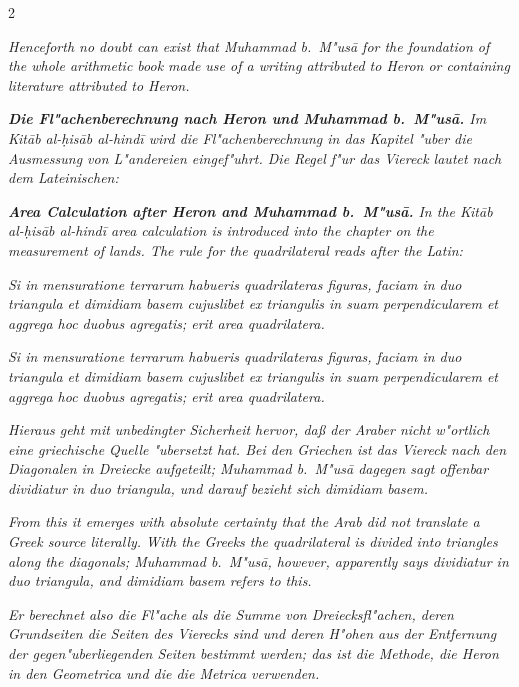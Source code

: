 \documentclass[10pt,a4paper]{article}
\begin{document}
\begin{paracol}{2}
\switchcolumn

\textit{Henceforth no doubt can exist that Muhammad b.\ M"us\=a for the foundation of the whole arithmetic book made use of a writing attributed to Heron or containing literature attributed to Heron.}

\switchcolumn*

\textit{\textbf{Die Fl"achenberechnung nach Heron und Muhammad b.\ M"us\=a.} Im \textit{Kit\=ab al-\d{h}is\=ab al-hind\=i} wird die Fl"achenberechnung in das Kapitel \textit{"uber die Ausmessung von L"andereien} eingef"uhrt. Die Regel f"ur das Viereck lautet nach dem Lateinischen:}

\switchcolumn

\textit{\textbf{Area Calculation after Heron and Muhammad b.\ M"us\=a.} In the \textit{Kit\=ab al-\d{h}is\=ab al-hind\=i} area calculation is introduced into the chapter \textit{on the measurement of lands}. The rule for the quadrilateral reads after the Latin:}

\switchcolumn*

\textit{\textit{Si in mensuratione terrarum habueris quadrilateras figuras, faciam in duo triangula et dimidiam basem cujuslibet ex triangulis in suam perpendicularem et aggrega hoc duobus agregatis; erit area quadrilatera.}}

\switchcolumn

\textit{\textit{Si in mensuratione terrarum habueris quadrilateras figuras, faciam in duo triangula et dimidiam basem cujuslibet ex triangulis in suam perpendicularem et aggrega hoc duobus agregatis; erit area quadrilatera.}}

\switchcolumn*

\textit{Hieraus geht mit unbedingter Sicherheit hervor, da\ss{} der Araber nicht w"ortlich eine griechische Quelle "ubersetzt hat. Bei den Griechen ist das Viereck nach den Diagonalen in Dreiecke aufgeteilt; Muhammad b.\ M"us\=a dagegen sagt offenbar \textit{dividiatur in duo triangula}, und darauf bezieht sich \textit{dimidiam basem}.}

\switchcolumn

\textit{From this it emerges with absolute certainty that the Arab did not translate a Greek source literally. With the Greeks the quadrilateral is divided into triangles along the diagonals; Muhammad b.\ M"us\=a, however, apparently says \textit{dividiatur in duo triangula}, and \textit{dimidiam basem} refers to this.}

\switchcolumn*

\textit{Er berechnet also die Fl"ache als die Summe von Dreiecksfl"achen, deren Grundseiten die Seiten des Vierecks sind und deren H"ohen aus der Entfernung der gegen"uberliegenden Seiten bestimmt werden; das ist die Methode, die Heron in den \textit{Geometrica} und die die \textit{Metrica} verwenden.}


\end{paracol}
\end{document}
